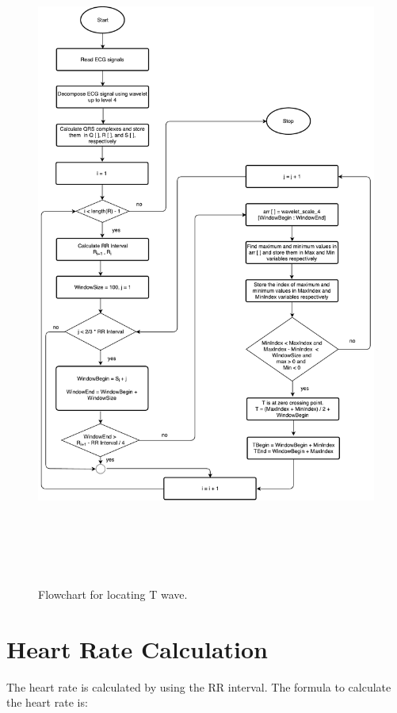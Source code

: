 \begin{figure}[htpb]
	\centering
	\includegraphics[width=25cm,height=22cm,keepaspectratio=true]{images/T_Wave.pdf}
	\caption{
		Flowchart for locating T wave.
	}
	\label{fig:t_peaks_flow_chart}
\end{figure}


\section{Heart Rate Calculation} \label{sec:heartrate}
The heart rate is calculated by using the RR interval. The formula to calculate the heart rate is:


